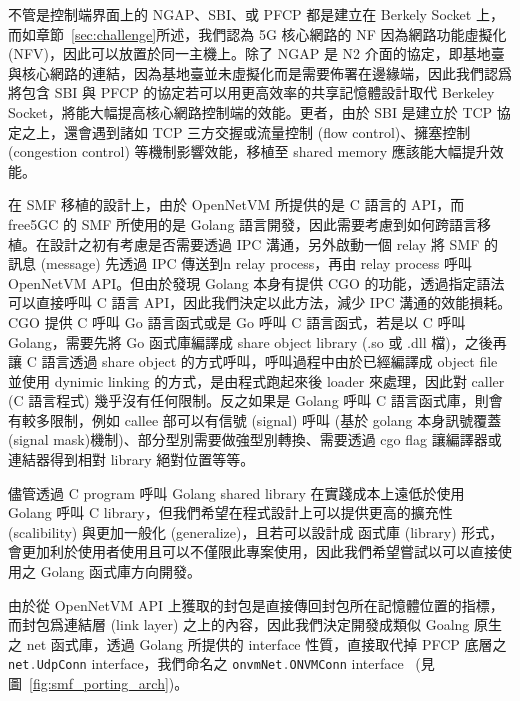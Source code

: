 不管是控制端界面上的 NGAP、SBI、或 PFCP 都是建立在 Berkely Socket 上，而如章節~\ref{sec:challenge}所述，我們認為 5G 核心網路的 NF 因為網路功能虛擬化 (NFV)，因此可以放置於同一主機上。除了 NGAP 是 N2 介面的協定，即基地臺與核心網路的連結，因為基地臺並未虛擬化而是需要佈署在邊緣端，因此我們認爲將包含 SBI 與 PFCP 的協定若可以用更高效率的共享記憶體設計取代 Berkeley Socket，將能大幅提高核心網路控制端的效能。更者，由於 SBI 是建立於 TCP 協定之上，還會遇到諸如 TCP 三方交握或流量控制 (flow control)、擁塞控制 (congestion control) 等機制影響效能，移植至 shared memory 應該能大幅提升效能。


在 SMF 移植的設計上，由於 OpenNetVM 所提供的是 C 語言的 API，而 free5GC 的 SMF 所使用的是 Golang 語言開發，因此需要考慮到如何跨語言移植。在設計之初有考慮是否需要透過 IPC 溝通，另外啟動一個 relay 將 SMF 的訊息 (message) 先透過 IPC 傳送到n relay process，再由 relay process 呼叫 OpenNetVM API。但由於發現 Golang 本身有提供 CGO 的功能，透過指定語法可以直接呼叫 C 語言 API，因此我們決定以此方法，減少 IPC 溝通的效能損耗。CGO 提供 C 呼叫 Go 語言函式或是 Go 呼叫 C 語言函式，若是以 C 呼叫 Golang，需要先將 Go 函式庫編譯成 share object library (.so 或 .dll 檔)，之後再讓 C 語言透過 share object 的方式呼叫，呼叫過程中由於已經編譯成 object file 並使用 dynimic linking 的方式，是由程式跑起來後 loader 來處理，因此對 caller (C 語言程式) 幾乎沒有任何限制。反之如果是 Golang 呼叫 C 語言函式庫，則會有較多限制，例如 callee 部可以有信號 (signal) 呼叫 (基於 golang 本身訊號覆蓋(signal mask)機制)、部分型別需要做強型別轉換、需要透過 cgo flag 讓編譯器或連結器得到相對 library 絕對位置等等。

儘管透過 C program 呼叫 Golang shared library 在實踐成本上遠低於使用 Golang 呼叫 C library，但我們希望在程式設計上可以提供更高的擴充性 (scalibility) 與更加一般化 (generalize)，且若可以設計成 函式庫 (library) 形式，會更加利於使用者使用且可以不僅限此專案使用，因此我們希望嘗試以可以直接使用之 Golang 函式庫方向開發。

由於從 OpenNetVM API 上獲取的封包是直接傳回封包所在記憶體位置的指標，而封包爲連結層 (link layer) 之上的內容，因此我們決定開發成類似 Goalng 原生之 net 函式庫，透過 Golang 所提供的 interface 性質，直接取代掉 PFCP 底層之 \lstinline[language=Go]{net.UdpConn} interface，我們命名之 \lstinline[language=Go]{onvmNet.ONVMConn} interface~\cite{github.onvmNet} (見圖~\ref{fig:smf_porting_arch})。

